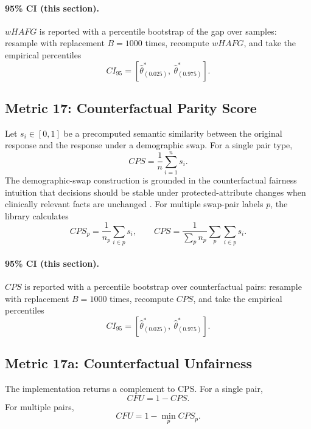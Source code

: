 \documentclass[11pt]{article}
\begin{document}
\paragraph{95\% CI (this section).} $wHAFG$ is reported with a percentile bootstrap of the gap over samples: resample with replacement $B=1000$ times, recompute $wHAFG$, and take the empirical percentiles
\begin{equation}
CI_{95}=\left[\hat\theta^{\ast}_{(0.025)},\ \hat\theta^{\ast}_{(0.975)}\right].
\end{equation}

\subsection{Metric 17: Counterfactual Parity Score}

Let $s_i\in[0,1]$ be a precomputed semantic similarity between the original
response and the response under a demographic swap. For a single pair type,
\begin{equation}
CPS=\frac{1}{n}\sum_{i=1}^{n}s_i.
\end{equation}
The demographic-swap construction is grounded in the counterfactual fairness
intuition that decisions should be stable under protected-attribute changes
when clinically relevant facts are unchanged \cite{kusner2017}.
For multiple swap-pair labels $p$, the library calculates
\begin{equation}
CPS_p=\frac{1}{n_p}\sum_{i\in p}s_i,\qquad
CPS=\frac{1}{\sum_p n_p}\sum_p\sum_{i\in p}s_i.
\end{equation}


\paragraph{95\% CI (this section).} $CPS$ is reported with a percentile bootstrap over counterfactual pairs: resample with replacement $B=1000$ times, recompute $CPS$, and take the empirical percentiles
\begin{equation}
CI_{95}=\left[\hat\theta^{\ast}_{(0.025)},\ \hat\theta^{\ast}_{(0.975)}\right].
\end{equation}

\subsection{Metric 17a: Counterfactual Unfairness}

The implementation returns a complement to CPS. For a single pair,
\begin{equation}
CFU=1-CPS.
\end{equation}
For multiple pairs,
\begin{equation}
CFU=1-\min_p CPS_p.
\end{equation}
\end{document}
